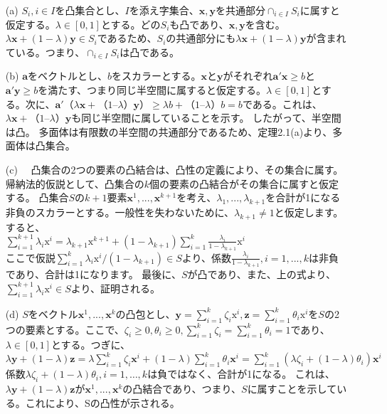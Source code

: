 \documentclass{jsarticle}
\begin{document}
\begin{itemize}
\item[(a)] $S_i,i\in I$を凸集合とし、$I$を添え字集合、$\bm{x},\bm{y}$を共通部分$\cap_{i \in I}S_i$に属すと仮定する。$\lambda \in [0,1]$とする。どの$S_i$も凸であり、$\bm{x},\bm{y}$を含む。$\lambda \bm{x}+(1-\lambda)\bm{y} \in S_i$であるため、$S_i$の共通部分にも$\lambda \bm{x}+(1-\lambda)\bm{y}$が含まれている。つまり、$\cap_{i \in I}S_i$は凸である。

\item[(b)] $\bm{a}$をベクトルとし、$b$をスカラーとする。$\bm{x}と\bm{y}$がそれぞれ$\bm{a}'\bm{x}\geq b$と$\bm{a}'\bm{y}\geq b$を満たす、つまり同じ半空間に属すると仮定する。$\lambda \in [0,1]$とする。次に、$\bm{a}'（\lambda \bm{x} +（1– \lambda）\bm{y}）\geq \lambda b +（1– \lambda）b = b$である。これは、$\lambda \bm{x} +（1– \lambda）\bm{y}$も同じ半空間に属していることを示す。 したがって、半空間は凸。 多面体は有限数の半空間の共通部分であるため、定理2.1(a)より、多面体は凸集合。

\item[(c)]　凸集合の2つの要素の凸結合は、凸性の定義により、その集合に属す。帰納法的仮説として、凸集合の$k$個の要素の凸結合がその集合に属すと仮定する。 凸集合$S$の$k+1$要素$\bm{x}^1,...,\bm{x}^{k+1}$を考え、$\lambda_1,...,\lambda_{k+1}$を合計が1になる非負のスカラーとする。一般性を失わないために、$\lambda_{k+1}\neq 1$と仮定します。 すると、\\
$\sum_{i=1}^{k+1} \lambda_{i} \mathrm{x}^{i}=\lambda_{k+1} \mathrm{x}^{k+1}+\left(1-\lambda_{k+1}\right) \sum_{i=1}^{k} \frac{\lambda_{i}}{1-\lambda_{k+1}} \mathrm{x}^{i}$\\
ここで仮説$\sum_{i=1}^{k} \lambda_{i} \mathrm{x}^{i} /\left(1-\lambda_{k+1}\right) \in S$より、係数$\frac{\lambda_{i}}{1-\lambda_{k+1}},i=1,...,k$は非負であり、合計は1になります。
最後に、$S$が凸であり、また、上の式より、$\sum_{i=1}^{k+1} \lambda_{i} \mathrm{x}^{i}\in S$より、証明される。

\item[(d)] $S$をベクトル$\bm{x}^1,...,\bm{x}^k$の凸包とし、$\bm{y}=\sum_{i=1}^{k} \zeta_{i} \mathrm{x}^{i}, \mathbf{z}=\sum_{i=1}^{k} \theta_{i} \mathrm{x}^{i}$を$S$の2つの要素とする。ここで、$\zeta_{i} \geq 0, \theta_{i} \geq 0,\sum_{i=1}^{k} \zeta_{i}=\sum_{i=1}^{k} \theta_{i}=1$であり、 $\lambda \in [0,1]$とする。つぎに、\\
$\lambda \mathbf{y}+(1-\lambda) \mathbf{z}=\lambda \sum_{i=1}^{k} \zeta_{i} \mathbf{x}^{i}+(1-\lambda) \sum_{i=1}^{k} \theta_{i} \mathbf{x}^{i}=\sum_{i=1}^{k}\left(\lambda \zeta_{i}+(1-\lambda) \theta_{i}\right) \mathbf{x}^{i}$\\
係数$\lambda \zeta_{i}+(1-\lambda) \theta_{i}, i=1, \ldots, k$は負ではなく、合計が1になる。 これは、$\lambda \mathbf{y}+(1-\lambda) \mathbf{z}$が$\bm{x}^1,...,\bm{x}^k$の凸結合であり、つまり、$S$に属すことを示している。これにより、Sの凸性が示される。
\end{itemize}
\end{document}
